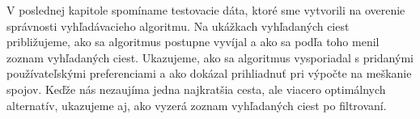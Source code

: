 V poslednej kapitole spomíname testovacie dáta, ktoré sme vytvorili na overenie správnosti vyhľadávacieho algoritmu. Na ukážkach vyhľadaných ciest približujeme, ako sa algoritmus postupne vyvíjal a ako sa podľa toho menil zoznam vyhľadaných ciest. Ukazujeme, ako sa algoritmus vysporiadal s pridanými používateľskými preferenciami a ako dokázal prihliadnuť pri výpočte na meškanie spojov. Keďže nás nezaujíma jedna najkratšia cesta, ale viacero optimálnych alternatív, ukazujeme aj, ako vyzerá zoznam vyhľadaných ciest po filtrovaní.


 
